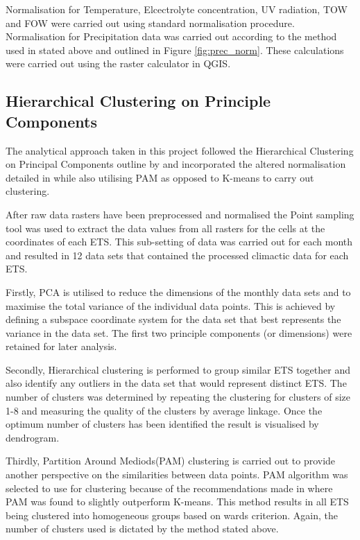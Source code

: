 \documentclass{article}
\begin{document}
Normalisation for Temperature, Elcectrolyte concentration, UV radiation, TOW and FOW were carried out using standard normalisation procedure. Normalisation for Precipitation data was carried out according to the method used in \citet{Netzel2016} stated above and outlined in Figure \ref{fig:prec_norm}. These calculations were carried out using the raster calculator in QGIS.

\subsection{Hierarchical Clustering on Principle Components}\label{hcpc}
The analytical approach taken in this project followed the Hierarchical Clustering on Principal Components outline by \citet{Praene2019} and incorporated the altered normalisation detailed in \citet{Netzel2016} while also utilising PAM as opposed to K-means to carry out clustering.

After raw data rasters have been preprocessed and normalised the Point sampling tool \citep{} was used to extract the data values from all rasters for the cells at the coordinates of each ETS. This sub-setting of data was carried out for each month and resulted in 12 data sets that contained the processed climactic data for each ETS. 

Firstly, PCA is utilised to reduce the dimensions of the monthly data sets and to maximise the total variance of the individual data points. This is achieved by defining a subspace coordinate system for the data set that best represents the variance in the data set. The first two principle components (or dimensions) were retained for later analysis.

Secondly, Hierarchical clustering is performed to group similar ETS together and also identify any outliers in the data set that would represent distinct ETS. The number of clusters was determined by repeating the clustering for clusters of size 1-8 and measuring the quality of the clusters by average linkage. Once the optimum number of clusters has been identified the result is visualised by dendrogram.

Thirdly, Partition Around Mediods(PAM) clustering is carried out to provide another perspective on the similarities between data points. PAM algorithm was selected to use for clustering because of the recommendations made in \citet{Netzel2016} where PAM was found to slightly outperform K-means. This method results in all ETS being clustered into homogeneous groups based on wards criterion. Again, the number of clusters used is dictated by the method stated above.
\end{document}
